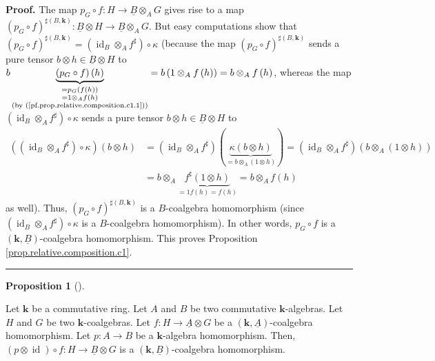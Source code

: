 \documentclass
[numbers=enddot,12pt,final,onecolumn,notitlepage,abstracton]{scrartcl}%
\theoremstyle{definition}
\newtheorem{prop}[theo]{Proposition}
\newenvironment{proposition}[1][]
{\begin{prop}[#1]\begin{leftbar}}
{\end{leftbar}\end{prop}}
\newenvironment{proof}[1][Proof]{\noindent\textbf{#1.} }{\ \rule{0.5em}{0.5em}}
\begin{document}
\begin{proof}
The map $p_{G}\circ f:H\rightarrow\underline{B}\otimes_{A}G$ gives rise to a
map $\left(  p_{G}\circ f\right)  ^{\sharp\left(  B,\mathbf{k}\right)
}:\underline{B}\otimes H\rightarrow\underline{B}\otimes_{A}G$. But easy
computations show that $\left(  p_{G}\circ f\right)  ^{\sharp\left(
B,\mathbf{k}\right)  }=\left(  \operatorname*{id}\nolimits_{B}\otimes
_{A}f^{\sharp}\right)  \circ\kappa$ (because the map $\left(  p_{G}\circ
f\right)  ^{\sharp\left(  B,\mathbf{k}\right)  }$ sends a pure tensor
$b\otimes h\in\underline{B}\otimes H$ to $b\underbrace{\left(  p_{G}\circ
f\right)  \left(  h\right)  }_{\substack{=p_{G}\left(  f\left(  h\right)
\right)  \\=1\otimes_{A}f\left(  h\right)  \\\text{(by
(\ref{pf.prop.relative.composition.c1.1}))}}}=b\left(  1\otimes_{A}f\left(
h\right)  \right)  =b\otimes_{A}f\left(  h\right)  $, whereas the map $\left(
\operatorname*{id}\nolimits_{B}\otimes_{A}f^{\sharp}\right)  \circ\kappa$
sends a pure tensor $b\otimes h\in\underline{B}\otimes H$ to
\begin{align*}
\left(  \left(  \operatorname*{id}\nolimits_{B}\otimes_{A}f^{\sharp}\right)
\circ\kappa\right)  \left(  b\otimes h\right)   &  =\left(  \operatorname*{id}%
\nolimits_{B}\otimes_{A}f^{\sharp}\right)  \left(  \underbrace{\kappa\left(
b\otimes h\right)  }_{=b\otimes_{A}\left(  1\otimes h\right)  }\right)
=\left(  \operatorname*{id}\nolimits_{B}\otimes_{A}f^{\sharp}\right)  \left(
b\otimes_{A}\left(  1\otimes h\right)  \right) \\
&  =b\otimes_{A}\underbrace{f^{\sharp}\left(  1\otimes h\right)  }_{=1f\left(
h\right)  =f\left(  h\right)  }=b\otimes_{A}f\left(  h\right)
\end{align*}
as well). Thus, $\left(  p_{G}\circ f\right)  ^{\sharp\left(  B,\mathbf{k}%
\right)  }$ is a $B$-coalgebra homomorphism (since $\left(  \operatorname*{id}%
\nolimits_{B}\otimes_{A}f^{\sharp}\right)  \circ\kappa$ is a $B$-coalgebra
homomorphism). In other words, $p_{G}\circ f$ is a $\left(  \mathbf{k}%
,\underline{B}\right)  $-coalgebra homomorphism. This proves Proposition
\ref{prop.relative.composition.c1}.
\end{proof}

\begin{proposition}
\label{prop.relative.composition.c2}Let $\mathbf{k}$ be a commutative ring.
Let $A$ and $B$ be two commutative $\mathbf{k}$-algebras. Let $H$ and $G$ be
two $\mathbf{k}$-coalgebras. Let $f:H\rightarrow\underline{A}\otimes G$ be a
$\left(  \mathbf{k},\underline{A}\right)  $-coalgebra homomorphism. Let
$p:A\rightarrow B$ be a $\mathbf{k}$-algebra homomorphism. Then, $\left(
p\otimes\operatorname*{id}\right)  \circ f:H\rightarrow\underline{B}\otimes G$
is a $\left(  \mathbf{k},\underline{B}\right)  $-coalgebra homomorphism.
\end{proposition}
\end{document}
